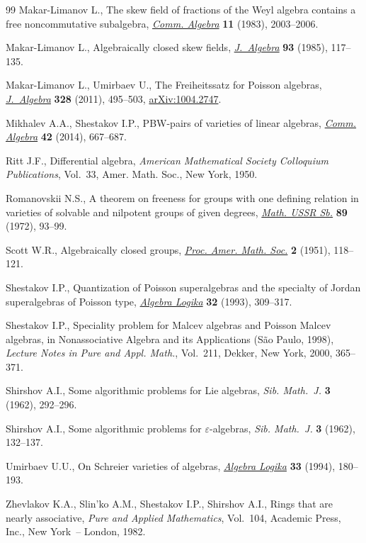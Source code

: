 \documentclass[pdftex]{sigma}
\begin{document}
\begin{thebibliography}{99}
Makar-Limanov L., The skew f\/ield of fractions of the {W}eyl algebra contains a
  free noncommutative subalgebra, \href{http://dx.doi.org/10.1080/00927878308822945}{\textit{Comm. Algebra}} \textbf{11} (1983),
  2003--2006.

Makar-Limanov L., Algebraically closed skew f\/ields, \href{http://dx.doi.org/10.1016/0021-8693(85)90177-2}{\textit{J.~Algebra}}
  \textbf{93} (1985), 117--135.

Makar-Limanov L., Umirbaev U., The {F}reiheitssatz for {P}oisson algebras,
  \href{http://dx.doi.org/10.1016/j.jalgebra.2010.08.015}{\textit{J.~Algebra}} \textbf{328} (2011), 495--503, \href{http://arxiv.org/abs/1004.2747}{arXiv:1004.2747}.

Mikhalev A.A., Shestakov I.P., P{BW}-pairs of varieties of linear algebras,
  \href{http://dx.doi.org/10.1080/00927872.2012.720867}{\textit{Comm. Algebra}} \textbf{42} (2014), 667--687.

Ritt J.F., Dif\/ferential algebra, \textit{American Mathematical Society
  Colloquium Publications}, Vol.~33, Amer. Math. Soc., New York, 1950.

Romanovskii N.S., A theorem on freeness for groups with one def\/ining relation
  in varieties of solvable and nilpotent groups of given degrees, \href{http://dx.doi.org/10.1070/SM1972v018n01ABEH001614}{\textit{Math.
  USSR Sb.}} \textbf{89} (1972), 93--99.

Scott W.R., Algebraically closed groups, \href{http://dx.doi.org/10.1090/S0002-9939-1951-0040299-6}{\textit{Proc. Amer. Math. Soc.}}
  \textbf{2} (1951), 118--121.

Shestakov I.P., Quantization of {P}oisson superalgebras and the specialty of
  {J}ordan superalgebras of {P}oisson type, \href{http://dx.doi.org/10.1007/BF02261711}{\textit{Algebra Logika}} \textbf{32}
  (1993), 309--317.

Shestakov I.P.,
Speciality problem for Malcev algebras and Poisson Malcev algebras,
in Nonassociative Algebra and its Applications (S\~ao Paulo, 1998),
\textit{Lecture Notes in Pure and Appl. Math.},
Vol.~211, Dekker, New York, 2000,
365--371.

Shirshov A.I., Some algorithmic problems for Lie algebras, \textit{Sib.
  Math.~J.} \textbf{3} (1962), 292--296.

Shirshov A.I., Some algorithmic problems for {$\varepsilon $}-algebras,
  \textit{Sib. Math.~J.} \textbf{3} (1962), 132--137.

Umirbaev U.U., On {S}chreier varieties of algebras, \href{http://dx.doi.org/10.1007/BF00750233}{\textit{Algebra Logika}}
  \textbf{33} (1994), 180--193.

Zhevlakov K.A., Slin'ko A.M., Shestakov I.P., Shirshov A.I., Rings that are
  nearly associative, \textit{Pure and Applied Mathematics}, Vol.~104, Academic
  Press, Inc., New York~-- London, 1982.

\end{thebibliography}\LastPageEnding
\end{document}
